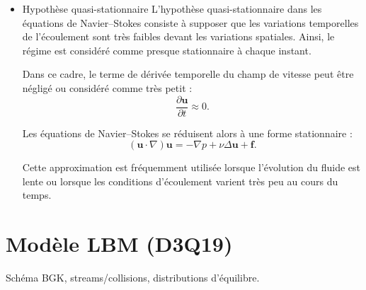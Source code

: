 \documentclass[12pt,a4paper]{report}
\begin{document}
\begin{itemize}
Les conditions aux limites les plus utilisées sont :

\begin{enumerate}
    \item \textbf{Condition de non-glissement (no-slip)} \\
    La vitesse du fluide au contact d’une paroi solide est nulle :
    \[
    \mathbf{u} = 0 \quad \text{sur } \partial \Omega.
    \]

    \item \textbf{Condition de vitesse imposée (Dirichlet)} \\
    On impose une vitesse connue sur la frontière :
    \[
    \mathbf{u} = \mathbf{g} \quad \text{sur } \partial \Omega.
    \]

    \item \textbf{Condition de Neumann} \\
    On impose la dérivée normale de la vitesse ou les contraintes exercées sur la frontière :
    \[
    \frac{\partial \mathbf{u}}{\partial n} = 0.
    \]

    \item \textbf{Condition périodique} \\
    Utilisée lorsque l’écoulement se répète périodiquement dans l’espace :
    \[
    \mathbf{u}(x+L,t)=\mathbf{u}(x,t).
    \]
\end{enumerate}
    \item Hypothèse quasi-stationnaire
    L’hypothèse quasi-stationnaire dans les équations de Navier--Stokes 
consiste à supposer que les variations temporelles de l’écoulement sont 
très faibles devant les variations spatiales. Ainsi, le régime est considéré 
comme presque stationnaire à chaque instant.

Dans ce cadre, le terme de dérivée temporelle du champ de vitesse peut être 
négligé ou considéré comme très petit :
\[
\frac{\partial \mathbf{u}}{\partial t} \approx 0.
\]

Les équations de Navier--Stokes se réduisent alors à une forme stationnaire :
\[
(\mathbf{u}\cdot\nabla)\mathbf{u}
= -\nabla p + \nu \Delta \mathbf{u} + \mathbf{f}.
\]

Cette approximation est fréquemment utilisée lorsque l’évolution du fluide 
est lente ou lorsque les conditions d’écoulement varient très peu au cours du temps.
\end{itemize}

\section{Modèle LBM (D3Q19)}
Schéma BGK, streams/collisions, distributions d’équilibre.
\end{document}
